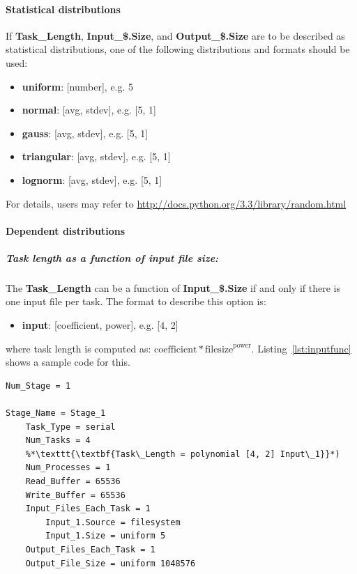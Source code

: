\documentclass[10pt,a4paper]{article}
\begin{document}
\paragraph{Statistical distributions}

If \textbf{Task\_Length}, \textbf{Input\_\$.Size}, and \textbf\textbf{Output\_\$.Size} are to be described as statistical distributions, one of the following distributions and formats should be used:

\begin{itemize}

\item{\textbf{uniform}}: [number], e.g. 5

\item{\textbf{normal}}: [avg, stdev], e.g. [5, 1]

\item{\textbf{gauss}}: [avg, stdev], e.g. [5, 1]

\item{\textbf{triangular}}: [avg, stdev], e.g. [5, 1]

\item{\textbf{lognorm}}: [avg, stdev], e.g. [5, 1]

\end{itemize}
For details, users may refer to \url{http://docs.python.org/3.3/library/random.html}

\paragraph{Dependent distributions}
\subparagraph{Task length as a function of input file size:} 

The \textbf{Task\_Length} can be a function of \textbf{Input\_\$.Size} if and only if there is one input file per task. The format to describe this option is:
\begin{itemize}
\item{\textbf{input}}: [coefficient, power], e.g. [4, 2]
\end{itemize}
where task length is computed as: \( \text{coefficient} * \text{filesize} ^ \text{power}\). 
Listing~\ref{lst:inputfunc} shows a sample code for this.

\begin{lstlisting}[caption=Use case of task length as a function of input file size, label=lst:inputfunc, linewidth=1.0\textwidth, xleftmargin=2.5ex]
Num_Stage = 1

Stage_Name = Stage_1
    Task_Type = serial
    Num_Tasks = 4  
    %*\texttt{\textbf{Task\_Length = polynomial [4, 2] Input\_1}}*)
    Num_Processes = 1
    Read_Buffer = 65536
    Write_Buffer = 65536
    Input_Files_Each_Task = 1
        Input_1.Source = filesystem
        Input_1.Size = uniform 5
    Output_Files_Each_Task = 1
    Output_File_Size = uniform 1048576
\end{lstlisting}
\end{document}
